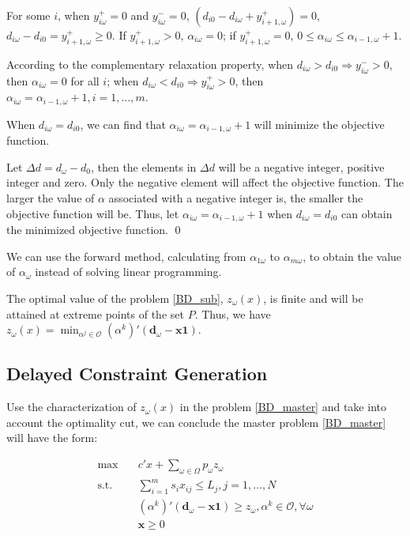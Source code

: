 For some $i$, when $y_{i \omega}^{+} = 0$ and $y_{i \omega}^{-} = 0$, $\left(d_{i 0}- d_{i \omega} + y_{i+1, \omega}^{+}\right) = 0$, $d_{i \omega}- d_{i 0} = y_{i+1, \omega}^{+} \geq 0$.
If $y_{i+1, \omega}^{+} > 0$, $\alpha_{i \omega} = 0$;
if $y_{i+1, \omega}^{+} = 0$, $0 \leq \alpha_{i \omega} \leq \alpha_{i-1, \omega} +1$.

\begin{pf}
  According to the complementary relaxation property, when
$d_{i \omega} > d_{i 0} \Rightarrow y_{i \omega}^{-} >0$, then $\alpha_{i \omega} =0$ for all $i$; when $d_{i \omega} < d_{i 0} \Rightarrow y_{i \omega}^{+} >0$, then $\alpha_{i \omega} = \alpha_{i-1,\omega} +1, i =1,\ldots,m$. 

When $d_{i \omega} = d_{i 0}$,  we can find that $\alpha_{i \omega} = \alpha_{i-1, \omega} + 1$ will minimize the objective function.

Let $\Delta d = d_{\omega} - d_0$, then the elements in $\Delta d$ will be a negative integer, positive integer and zero. 
Only the negative element will affect the objective function.
The larger the value of $\alpha$ associated with a negative integer is, the smaller the objective function will be. Thus, let $\alpha_{i \omega} = \alpha_{i-1, \omega} + 1$ when $d_{i \omega} = d_{i 0}$ can obtain the minimized objective function.
\qed
\end{pf}

We can use the forward method, calculating from $\alpha_{1 \omega}$ to $\alpha_{m \omega}$, to obtain the value of $\alpha_{\omega}$ instead of solving linear programming.


The optimal value of the problem \eqref{BD_sub}, $z_{\omega}(x)$, is finite and will be attained at extreme points of the set $P$. Thus, we have $z_{\omega}(x) = \min_{\alpha^j \in \mathcal{O}} (\alpha^{k}){'}(\mathbf{d}_{\omega}- \mathbf{x} \mathbf{1})$. 


\subsection{Delayed Constraint Generation}

Use the characterization of $z_{\omega}(x)$ in the problem \eqref{BD_master} and take into account the optimality cut, we can conclude the master problem \eqref{BD_master} will have the form:

\begin{equation}\label{BD_master1}
  \begin{aligned}
    \max \quad & c{'} x + \sum_{\omega \in \Omega} p_{\omega} z_{\omega} \\
    \text {s.t.} \quad & \sum_{i=1}^{m} s_{i} x_{ij} \leq L_j, j =1,\ldots, N \\
    & (\alpha^{k}){'}(\mathbf{d}_{\omega}- \mathbf{x} \mathbf{1}) \geq z_{\omega}, \alpha^k \in \mathcal{O}, \forall \omega \\
     & \mathbf{x} \geq 0
  \end{aligned}
\end{equation}

